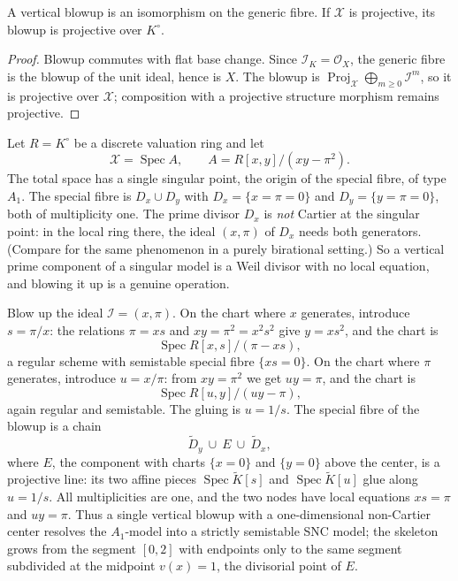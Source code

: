 \begin{proposition}
\label{prop:vertical-blowup-generic-iso}
A vertical blowup is an isomorphism on the generic fibre. If $\mathcal X$ is
projective, its blowup is projective over $K^\circ$.
\end{proposition}
\begin{proof}
Blowup commutes with flat base change. Since $\mathcal I_K=\mathcal O_X$, the
generic fibre is the blowup of the unit ideal, hence is $X$. The blowup is
$\operatorname{Proj}_{\mathcal X}\bigoplus_{m\geq0}\mathcal I^m$, so it is
projective over $\mathcal X$; composition with a projective structure
morphism remains projective.
\end{proof}

\begin{example}
\label{ex:vertical-blowup-weil-center}
Let $R=K^\circ$ be a discrete valuation ring and let
\[
        \mathcal X=\operatorname{Spec}A,\qquad A=R[x,y]/(xy-\pi^2).
\]
The total space has a single singular point, the origin of the special
fibre, of type $A_1$.  The special fibre is $D_x\cup D_y$ with
$D_x=\{x=\pi=0\}$ and $D_y=\{y=\pi=0\}$, both of multiplicity one.  The
prime divisor $D_x$ is \emph{not} Cartier at the singular point: in the
local ring there, the ideal $(x,\pi)$ of $D_x$ needs both generators.
(Compare  for the same phenomenon in a
purely birational setting.)  So a vertical prime component of a singular
model is a Weil divisor with no local equation, and blowing it up is a
genuine operation.

Blow up the ideal $\mathcal I=(x,\pi)$.  On the chart where $x$ generates,
introduce $s=\pi/x$: the relations $\pi=xs$ and $xy=\pi^2=x^2s^2$ give
$y=xs^2$, and the chart is
\[
        \operatorname{Spec}R[x,s]/(\pi-xs),
\]
a regular scheme with semistable special fibre $\{xs=0\}$.  On the chart
where $\pi$ generates, introduce $u=x/\pi$: from $xy=\pi^2$ we get
$uy=\pi$, and the chart is
\[
        \operatorname{Spec}R[u,y]/(uy-\pi),
\]
again regular and semistable.  The gluing is $u=1/s$.  The special fibre of
the blowup is a chain
\[
             \widetilde D_y\ \cup\ E\ \cup\ \widetilde D_x ,
\]
where $E$, the component with charts $\{x=0\}$ and $\{y=0\}$ above the
center, is a projective line: its two affine pieces
$\operatorname{Spec}\widetilde K[s]$ and
$\operatorname{Spec}\widetilde K[u]$ glue along $u=1/s$.  All
multiplicities are one, and the two nodes have local equations $xs=\pi$
and $uy=\pi$.  Thus a single vertical blowup with a one-dimensional
non-Cartier center resolves the $A_1$-model into a strictly semistable
SNC model; the skeleton grows from the segment $[0,2]$ with endpoints only
to the same segment subdivided at the midpoint $v(x)=1$, the divisorial
point of $E$.
\end{example}

